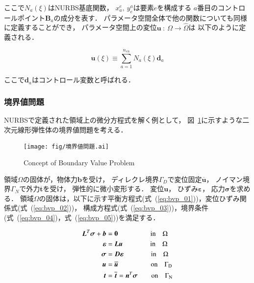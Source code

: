 \noindent
ここで$N_a(\xi)$はNURBS基底関数，
${x^e_a,\ y^a_e}$は要素$e$を構成する
$a$番目のコントロールポイント$\boldsymbol{B}_a$の成分を表す．
パラメータ空間全体で他の関数についても同様に定義することができ，
パラメータ空間上の変位$\boldsymbol{u}\ :\ \Omega \rightarrow \hat{\Omega}$は
以下のように定義される．

\begin{equation}
  \boldsymbol{u}(\xi) \equiv \sum_{a=1}^{n_{en}}N_a(\xi)\boldsymbol{d}_a
\end{equation}

\noindent
ここで$\boldsymbol{d}_a$はコントロール変数と呼ばれる．

\subsubsection{境界値問題}
NURBSで定義された領域上の微分方程式を解く例として，
図~\ref{fig:boundary problem}に示すような二次元線形弾性体の境界値問題を考える．

\begin{figure}[htbp]
  \centering
  \texttt{[image: fig/境界値問題.ai]}
  \caption{Concept of Boundary Value Problem}
  \label{fig:boundary problem}
\end{figure}

\newpage

\noindent
領域$\Omega$の固体が，物体力$\boldsymbol{b}$を受け，
ディレクレ境界$\Gamma_D$で変位固定$\overline{\boldsymbol{u}}$，
ノイマン境界$\Gamma_N$で外力$\overline{\boldsymbol{t}}$を受け，
弾性的に微小変形する．
変位$\boldsymbol{u}$，
ひずみ$\boldsymbol{\varepsilon}$，
応力$\boldsymbol{\sigma}$を求める．
領域$\Omega$の固体は，以下に示す平衡方程式(式~(\ref{eq:bvp_01}))，変位ひずみ関係式(式~(\ref{eq:bvp_02}))，
構成方程式(式~(\ref{eq:bvp_03}))，境界条件(式~(\ref{eq:bvp_04})，式~(\ref{eq:bvp_05}))を満足する．

\begin{align}
  \label{eq:bvp_01}
  \boldsymbol{L}^T \boldsymbol{\sigma} + \boldsymbol{b} &= \boldsymbol{0} \ \ \ \qquad \qquad \rm{in} \quad \Omega\\
  \label{eq:bvp_02}
  \boldsymbol{\varepsilon} &= \boldsymbol{L} \boldsymbol{u} \qquad \qquad \rm{in} \quad \Omega\\
  \label{eq:bvp_03}
  \boldsymbol{\sigma} &= \boldsymbol{D} \boldsymbol{\varepsilon} \qquad \qquad \rm{in} \quad \Omega\\
  \label{eq:bvp_04}
  \boldsymbol{u} &= \overline{\boldsymbol{u}} \ \ \ \qquad \qquad \rm{on} \quad \Gamma_D\\
  \label{eq:bvp_05}
  \boldsymbol{t} &= \overline{\boldsymbol{t}} = \boldsymbol{n}^T \boldsymbol{\sigma} \qquad \rm{on} \quad \Gamma_N
\end{align}

